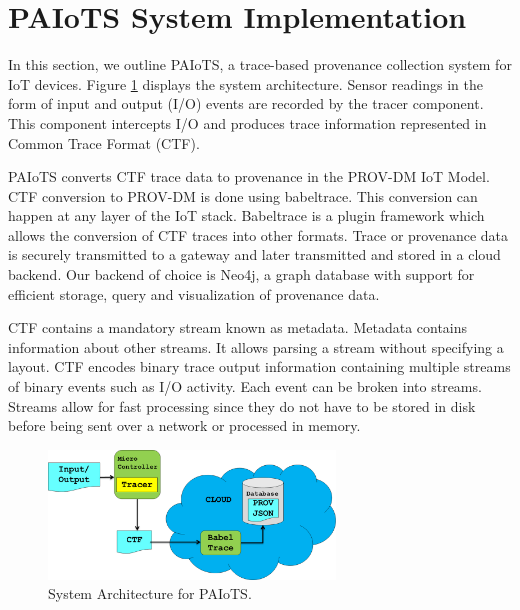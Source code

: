 \documentclass[conference]{IEEEtran}
\begin{document}
\section{PAIoTS System Implementation}
In this section, we outline  PAIoTS, a trace-based provenance collection system for IoT devices. Figure \ref{architecture} displays the system architecture. Sensor readings in the form of input and output (I/O) events are recorded by the tracer component. This component intercepts I/O and produces trace information represented in Common Trace Format (CTF). 


PAIoTS converts CTF trace data to provenance in the PROV-DM IoT Model. CTF conversion to PROV-DM is done using babeltrace. This conversion can happen at any layer of the IoT stack. Babeltrace is a plugin framework which allows the conversion of CTF traces into other formats. Trace or provenance data is securely transmitted to a gateway and later transmitted and stored in a cloud backend. Our backend of choice is Neo4j, a graph database with support for efficient storage, query and visualization of provenance data. 

\par CTF contains a mandatory stream known as metadata. Metadata contains information about other streams. It allows parsing a stream without specifying a layout. CTF encodes binary trace output information containing multiple streams of binary events such as I/O activity. Each event can be broken into streams. Streams allow for fast processing since they do not have to be stored in disk before being sent over a network or processed in memory.





\begin{figure}[h!]
\begin{center}

\includegraphics[width =3.0in]{system_architecture.PNG}    
\end{center}
\caption{System Architecture for PAIoTS.}
\label{architecture}
\end{figure}
\end{document}
